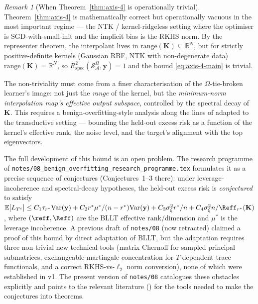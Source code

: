 \documentclass[11pt,a4paper]{article}
\theoremstyle{plain}
\theoremstyle{definition}
\theoremstyle{remark}
\newtheorem{remark}[theorem]{Remark}
\newcommand{\by}{\mathbf{y}}
\newcommand{\bK}{\mathbf{K}}
\newcommand{\E}{\mathbb{E}}
\newcommand{\R}{\mathbb{R}}
\newcommand{\Var}{\mathrm{Var}}
\newcommand{\Rspec}{R^2_{\mathrm{spec}}}
\newcommand{\Scal}{\mathcal{S}}
\newcommand{\Acal}{\mathcal{A}}
\begin{document}
\begin{remark}[When Theorem~\ref{thm:axis-4} is operationally
trivial]
\label{rem:axis-4-trivial}
Theorem~\ref{thm:axis-4} is mathematically correct but
operationally vacuous in the most important regime --- the
NTK / kernel-ridgeless setting where the optimiser is
SGD-with-small-init and the implicit bias is the RKHS norm.
By the representer theorem, the interpolant lives in
$\mathrm{range}(\bK) \subseteq \R^N$, but for strictly
positive-definite kernels (Gaussian RBF, NTK with non-degenerate
data) $\mathrm{range}(\bK) = \R^N$, so $\Rspec(\Scal_\Acal^\Omega, \by) = 1$
and the bound \eqref{eq:axis-4-main} is trivial.

The non-triviality must come from a finer characterisation of the
$\Omega$-tie-broken learner's image: not just the \emph{range} of the
kernel, but the \emph{minimum-norm interpolation map's effective
output subspace}, controlled by the spectral decay of $\bK$. This
requires a benign-overfitting-style analysis along the lines of
\citet{BartlettLongLugosiTsigler2020} adapted to the transductive
setting --- bounding the held-out excess risk as a function of the
kernel's effective rank, the noise level, and the target's
alignment with the top eigenvectors.

The full development of this bound is an open problem. The
research programme of
\texttt{notes/08\_benign\_overfitting\_research\_programme.tex}
formulates it as a precise sequence of conjectures
(Conjectures~1--3 there): under leverage-incoherence and
spectral-decay hypotheses, the held-out excess risk is
\emph{conjectured} to satisfy
$\E[L_{T^c}] \le C_1\tau_{r^*}\Var(\by) + C_2 r^*\mu^*/(n - r^*)
\Var(\by) + C_3\sigma_\xi^2 r^*/n + C_4 \sigma_\xi^2 n/\Reff_{r^*}(\bK)$,
where $(\reff, \Reff)$ are the BLLT effective rank/dimension and
$\mu^*$ is the leverage incoherence. A previous draft of
\texttt{notes/08} (now retracted) claimed a proof of this bound by
direct adaptation of BLLT, but the adaptation requires three
non-trivial new technical tools (matrix Chernoff for sampled
principal submatrices, exchangeable-martingale concentration for
$T$-dependent trace functionals, and a correct RKHS-vs-$\ell_2$
norm conversion), none of which were established in v1. The
present version of \texttt{notes/08} catalogues these obstacles
explicitly and points to the relevant literature
(\citealp{Tropp2012,Cohen2016sparsification,DerezinskiLiaoDoblerMahoney2020,Chatterjee2007exchangeable})
for the tools needed to make the conjectures into theorems.
\end{remark}
\end{document}
